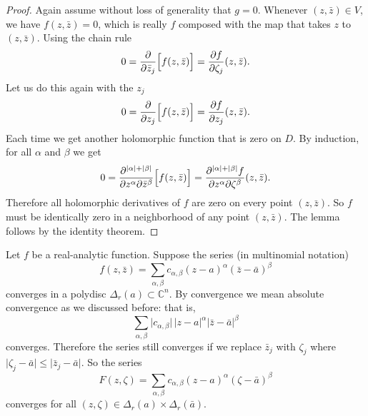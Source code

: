\documentclass[12pt,openany]{book}
\newcommand{\sabs}[1]{\lvert {#1} \rvert}
\newcommand{\C}{{\mathbb{C}}}
\theoremstyle{plain}
\theoremstyle{remark}
\theoremstyle{definition}
\theoremstyle{exercise}
\theoremstyle{example}
\begin{document}
\begin{proof}
Again assume without loss of generality that $g=0$.
Whenever $(z,\bar{z}) \in V$, we have $f(z,\bar{z}) = 0$, which is really
$f$ composed with the map that takes $z$ to $(z,\bar{z})$.  Using the chain rule
\begin{equation*}
0 =
\frac{\partial}{\partial \bar{z}_j} \Bigl[f(z,\bar{z})\Bigr]
=
\frac{\partial f}{\partial \zeta_j}(z,\bar{z}) .
\end{equation*}
Let us do this again with the $z_j$
\begin{equation*}
0 =
\frac{\partial}{\partial z_j} \Bigl[f(z,\bar{z})\Bigr]
=
\frac{\partial f}{\partial z_j}(z,\bar{z}) .
\end{equation*}
Each time we get another holomorphic function that is zero on $D$.
By induction, for all $\alpha$ and $\beta$ we get
\begin{equation*}
0 =
\frac{\partial^{\sabs{\alpha}+\sabs{\beta}}}{\partial z^\alpha \partial \bar{z}^\beta} \Bigl[f(z,\bar{z})\Bigr]
=
\frac{\partial^{\sabs{\alpha}+\sabs{\beta}} f}{\partial z^\alpha \partial
\zeta^\beta}(z,\bar{z}) .
\end{equation*}
Therefore all holomorphic derivatives of $f$ are zero on every point
$(z,\bar{z})$.  So $f$ must be identically zero in a neighborhood of any
point $(z,\bar{z})$.  The lemma follows by the identity
theorem.
\end{proof}

Let $f$ be a real-analytic function.  Suppose 
the series (in multinomial notation)
\begin{equation*}
f(z,\bar{z}) =
\sum_{\alpha,\beta} c_{\alpha,\beta} {(z-a)}^\alpha
{(\bar{z}-\bar{a})}^\beta
\end{equation*}
converges in a polydisc $\Delta_r(a) \subset \C^n$.
By convergence we mean absolute
convergence as we discussed before: that is,
\begin{equation*}
\sum_{\alpha,\beta} \sabs{c_{\alpha,\beta}} \, \sabs{z-a}^\alpha
\sabs{\bar{z}-\bar{a}}^\beta
\end{equation*}
converges.
Therefore the series still converges if we replace $\bar{z}_j$  with
$\zeta_j$ where $\sabs{\zeta_j-\bar{a}} \leq \sabs{\bar{z}_j-\bar{a}}$.
So the series
\begin{equation*}
F(z,\zeta) =
\sum_{\alpha,\beta} c_{\alpha,\beta} {(z-a)}^\alpha
{(\zeta-\bar{a})}^\beta
\end{equation*}
converges for all $(z,\zeta) \in \Delta_r(a) \times \Delta_r(\bar{a})$.
\end{document}
